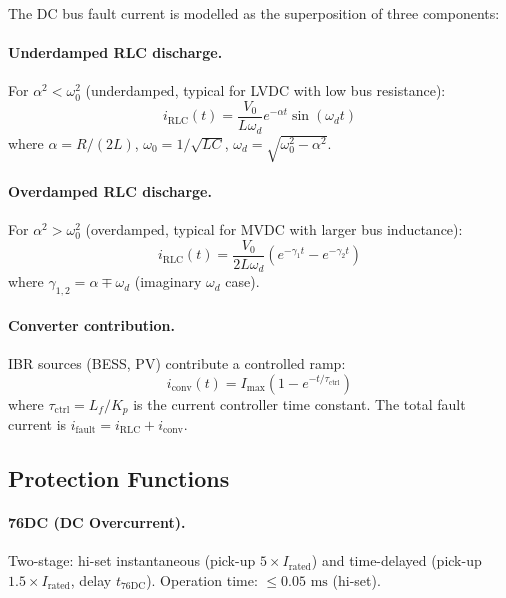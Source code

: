 \documentclass[11pt, a4paper]{article}
\newcommand{\ms}{\,\text{ms}}
\begin{document}
The DC bus fault current is modelled as the superposition of three components:

\paragraph{Underdamped RLC discharge.}
For $\alpha^2 < \omega_0^2$ (underdamped, typical for LVDC with low
bus resistance):
\begin{equation}
  i_{\mathrm{RLC}}(t) = \frac{V_0}{L\omega_d}
    e^{-\alpha t}\sin(\omega_d t)
  \label{eq:underdamped}
\end{equation}
where $\alpha = R/(2L)$, $\omega_0 = 1/\sqrt{LC}$,
$\omega_d = \sqrt{\omega_0^2 - \alpha^2}$.

\paragraph{Overdamped RLC discharge.}
For $\alpha^2 > \omega_0^2$ (overdamped, typical for MVDC with larger
bus inductance):
\begin{equation}
  i_{\mathrm{RLC}}(t) = \frac{V_0}{2L\omega_d}
    \left(e^{-\gamma_1 t} - e^{-\gamma_2 t}\right)
  \label{eq:overdamped}
\end{equation}
where $\gamma_{1,2} = \alpha \mp \omega_d$ (imaginary $\omega_d$ case).

\paragraph{Converter contribution.}
IBR sources (BESS, PV) contribute a controlled ramp:
\begin{equation}
  i_{\mathrm{conv}}(t) = I_{\max}\left(1 - e^{-t/\tau_{\mathrm{ctrl}}}\right)
  \label{eq:iconv}
\end{equation}
where $\tau_{\mathrm{ctrl}} = L_f / K_p$ is the current controller time constant.
The total fault current is $i_{\mathrm{fault}} = i_{\mathrm{RLC}} + i_{\mathrm{conv}}$.

\subsection{Protection Functions}

\paragraph{76DC (DC Overcurrent).}
Two-stage: hi-set instantaneous (pick-up $5\times I_{\mathrm{rated}}$)
and time-delayed (pick-up $1.5\times I_{\mathrm{rated}}$, delay $t_{\mathrm{76DC}}$).
Operation time: $\leq 0.05\,\ms$ (hi-set).
\end{document}
